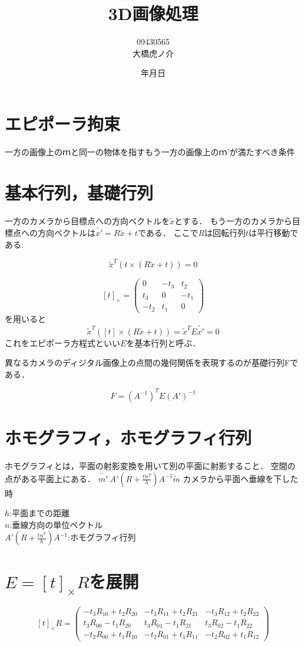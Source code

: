\documentclass[11pt]{jarticle}
\begin{document}
\title{3D画像処理}
\author{09430565\\大橋虎ノ介}
\date{\number\year 年\number\month 月\number\day 日}
\maketitle

\section{エピポーラ拘束}

一方の画像上のｍと同一の物体を指すもう一方の画像上のｍ’が満たすべき条件

\section{基本行列，基礎行列}

一方のカメラから目標点への方向ベクトルを$\tilde{x}$とする．
もう一方のカメラから目標点への方向ベクトルは$\tilde{x'}=R\tilde{x}+t$である．
ここで$R$は回転行列$t$は平行移動である.

\[\tilde{x}^{T}(t\times(R\tilde{x}+t))=0\]

\[[t]_{\times}=
  \left(
    \begin{array}{ccc}
      0 & -t_{3} & t_{2}\\
      t_{3} & 0 & -t_{1} \\
      -t_{2} & t_{1} & 0
    \end{array}
  \right)
\]
を用いると\[\tilde{x}^{T}([t]\times(R\tilde{x}+t))=\tilde{x}^{T}E\tilde{x'}=0\]
これをエピポーラ方程式といい$E$を基本行列と呼ぶ．

異なるカメラのディジタル画像上の点間の幾何関係を表現するのが基礎行列Fである．

\[F=(A^{-1})^{T}E(A')^{-1}\]

\section{ホモグラフィ，ホモグラフィ行列}

ホモグラフィとは，平面の射影変換を用いて別の平面に射影すること．
空間の点がある平面上にある．
$\tilde{m'}~A'(R+\frac{tn^{T}}{h})A^{-1}\tilde{m}$
カメラから平面へ垂線を下した時

\noindent
$h$:平面までの距離\\
$n$:垂線方向の単位ベクトル\\
$A'(R+\frac{tn^{T}}{h})A^{-1}$:ホモグラフィ行列\\

\section{$E=[t]_{\times}R$を展開}

\[[t]_{\times}R=
  \left(
    \begin{array}{ccc}
      -t_{3}R_{10}+t_{2}R_{20} & -t_{3}R_{11}+t_{2}R_{21} & -t_{3}R_{12}+t_{2}R_{22} \\
      t_{3}R_{00}-t_{1}R_{20} & t_{3}R_{01}-t_{1}R_{21} & t_{3}R_{02}-t_{1}R_{22} \\
      -t_{2}R_{00}+t_{1}R_{10} & -t_{2}R_{01}+t_{1}R_{11} & -t_{2}R_{02}+t_{1}R_{12}
    \end{array}
  \right)
\]
\end{document}
